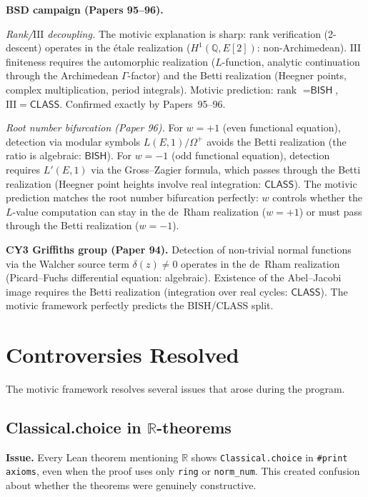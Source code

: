 \documentclass[11pt,a4paper]{article}
\newcommand{\Sha}{\mathrm{III}}
\theoremstyle{plain}
\theoremstyle{definition}
\newcommand{\BISH}{\textsf{BISH}}
\newcommand{\CLASS}{\textsf{CLASS}}
\newcommand{\Q}{\mathbb{Q}}
\newcommand{\R}{\mathbb{R}}
\begin{document}
\medskip
\noindent\textbf{BSD campaign (Papers 95--96).}

\emph{Rank/$\Sha$ decoupling.} The motivic explanation is sharp: rank verification (2-descent) operates in the \'etale realization ($H^1(\Q, E[2])$: non-Archimedean). $\Sha$ finiteness requires the automorphic realization ($L$-function, analytic continuation through the Archimedean $\Gamma$-factor) and the Betti realization (Heegner points, complex multiplication, period integrals). Motivic prediction: rank $= \BISH$, $\Sha = \CLASS$. Confirmed exactly by Papers~95--96.

\emph{Root number bifurcation (Paper 96).} For $w = +1$ (even functional equation), detection via modular symbols $L(E,1)/\Omega^+$ avoids the Betti realization (the ratio is algebraic: $\BISH$). For $w = -1$ (odd functional equation), detection requires $L'(E,1)$ via the Gross--Zagier formula, which passes through the Betti realization (Heegner point heights involve real integration: $\CLASS$). The motivic prediction matches the root number bifurcation perfectly: $w$ controls whether the $L$-value computation can stay in the de~Rham realization ($w = +1$) or must pass through the Betti realization ($w = -1$).

\medskip
\noindent\textbf{CY3 Griffiths group (Paper 94).} Detection of non-trivial normal functions via the Walcher source term $\delta(z) \neq 0$ operates in the de~Rham realization (Picard--Fuchs differential equation: algebraic). Existence of the Abel--Jacobi image requires the Betti realization (integration over real cycles: $\CLASS$). The motivic framework perfectly predicts the BISH/CLASS split.

\section{Controversies Resolved}\label{app:controversies}

The motivic framework resolves several issues that arose during the program.

\subsection{Classical.choice in $\R$-theorems}

\textbf{Issue.} Every Lean theorem mentioning $\R$ shows \texttt{Classical.choice} in \texttt{\#print axioms}, even when the proof uses only \texttt{ring} or \texttt{norm\_num}. This created confusion about whether the theorems were genuinely constructive.
\end{document}
